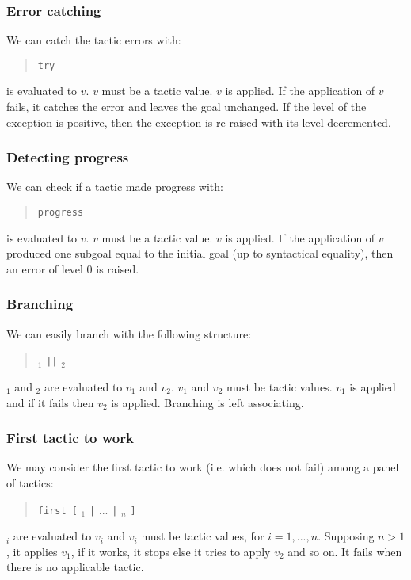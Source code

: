 \subsubsection{Error catching}

We can catch the tactic errors with:
\begin{quote}
{\tt try} {\tacexpr}
\end{quote}
{\tacexpr} is evaluated to $v$. $v$ must be a tactic value. $v$ is
applied. If the application of $v$ fails, it catches the error and
leaves the goal unchanged. If the level of the exception is positive,
then the exception is re-raised with its level decremented.

\subsubsection{Detecting progress}

We can check if a tactic made progress with:
\begin{quote}
{\tt progress} {\tacexpr}
\end{quote}
{\tacexpr} is evaluated to $v$. $v$ must be a tactic value. $v$ is
applied. If the application of $v$ produced one subgoal equal to the
initial goal (up to syntactical equality), then an error of level 0 is
raised. 

\ErrMsg {}

\subsubsection{Branching}
\tacindex{$\mid\mid$}

We can easily branch with the following structure:
\begin{quote}
{\tacexpr}$_1$ {\tt ||} {\tacexpr}$_2$
\end{quote}
{\tacexpr}$_1$ and {\tacexpr}$_2$ are evaluated to $v_1$ and
$v_2$. $v_1$ and $v_2$ must be tactic values. $v_1$ is applied and if
it fails then $v_2$ is applied. Branching is left associating.

\subsubsection{First tactic to work}

We may consider the first tactic to work (i.e. which does not fail) among a
panel of tactics:
\begin{quote}
{\tt first [} {\tacexpr}$_1$ {\tt |} $...$ {\tt |} {\tacexpr}$_n$ {\tt ]}
\end{quote}
{\tacexpr}$_i$ are evaluated to $v_i$ and $v_i$ must be tactic values, for 
$i=1,...,n$. Supposing $n>1$, it applies $v_1$, if it works, it stops else it
tries to apply $v_2$ and so on. It fails when there is no applicable tactic.

